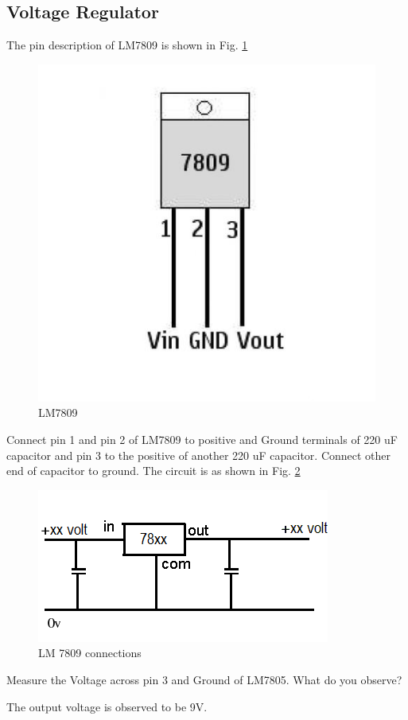 \documentclass[journal,12pt,twocolumn]{IEEEtran}
\begin{document}
\subsection{Voltage Regulator}
The pin description of LM7809 is shown in Fig. \ref{fig4}
\begin{figure}[h]
\centering
	\includegraphics[scale=0.4]{./figs/ic.jpg}
	\caption{LM7809}  \label{fig4}
    \end{figure}

\begin{problem}
Connect pin 1 and pin 2 of LM7809 to positive and Ground terminals of 220 uF capacitor and pin 3 to the positive of another 220 uF capacitor. Connect other end of capacitor to ground. The circuit is as shown in Fig. \ref{lm7809} 
\begin{figure}[h]
\centering
	\includegraphics[scale=0.5]{./figs/lm7809.png}
	\caption{LM 7809 connections}  \label{lm7809}
    \end{figure}
\end{problem} 
\begin{problem}
Measure the Voltage across pin 3 and Ground of LM7805. What do you observe?
\end{problem}
\solution
The output voltage is observed to be 9V.
\end{document}
